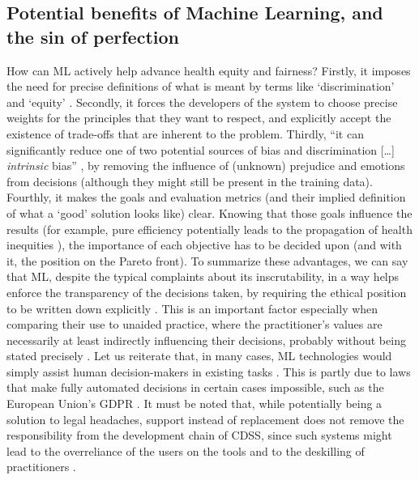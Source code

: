 \subsection{Potential benefits of Machine Learning, and the sin of perfection}
    How can ML actively help advance health equity and fairness?
    Firstly, it imposes the need for precise definitions of what is meant by terms like `discrimination' and `equity' \cite{Zerilli2019}.
    Secondly, it forces the developers of the system to choose precise weights for the principles that they want to respect, and explicitly accept the existence of trade-offs that are inherent to the problem.
    Thirdly, ``it can significantly reduce one of two potential sources of bias and discrimination [\dots] \emph{intrinsic} bias'' \cite[p.~672]{Zerilli2019}, by removing the influence of (unknown) prejudice and emotions from decisions (although they might still be present in the training data).
    Fourthly, it makes the goals and evaluation metrics (and their implied definition of what a `good' solution looks like) clear.
    Knowing that those goals influence the results \cite{Dijkstra2020} (for example, pure efficiency potentially leads to the propagation of health inequities \cite{Rajkomar2018}), the importance of each objective has to be decided upon (and with it, the position on the Pareto front).
    To summarize these advantages, we can say that ML, despite the typical complaints about its inscrutability, in a way helps enforce the transparency of the decisions taken, by requiring the ethical position to be written down explicitly \cite{Williamson2021}.
    This is an important factor especially when comparing their use to unaided practice, where the practitioner's values are necessarily at least indirectly influencing their decisions, probably without being stated precisely \cite{Zerilli2019}.
    Let us reiterate that, in many cases, ML technologies would simply assist human decision-makers in existing tasks \cite{Morley2020}.
    This is partly due to laws that make fully automated decisions in certain cases impossible, such as the European Union's GDPR \cite{Zerilli2019}.
    It must be noted that, while potentially being a solution to legal headaches, support instead of replacement does not remove the responsibility from the development chain of CDSS, since such systems might lead to the overreliance of the users on the tools and to the deskilling of practitioners \cite{Morley2020}.

